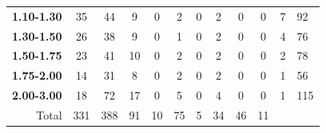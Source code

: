 \begin{table}[]
\begin{tabular}{r|cccccccccll}
\textbf{1.10-1.30}        & 35                          & 44                          & 9                           & 0                        & 2                          & 0                          & 2                          & 0                        & 0                          & 7      & 92    \\
\textbf{1.30-1.50}        & 26                          & 38                          & 9                           & 0                        & 1                          & 0                          & 2                          & 0                        & 0                          & 4      & 76    \\
\textbf{1.50-1.75}        & 23                          & 41                          & 10                          & 0                        & 2                          & 0                          & 2                          & 0                        & 0                          & 2      & 78    \\
\textbf{1.75-2.00}        & 14                          & 31                          & 8                           & 0                        & 2                          & 0                          & 2                          & 0                        & 0                          & 1      & 56    \\
\textbf{2.00-3.00}        & 18                          & 72                          & 17                          & 0                        & 5                          & 0                          & 4                          & 0                        & 0                          & 1      & 115   \\ \hline
Total                     & 331                         & 388                         & 91                          & 10                       & 75                         & 5                          & 34                         & 46                       & 11                         &        &      
\end{tabular}
\end{table}

